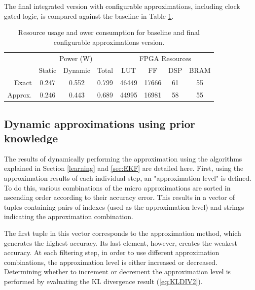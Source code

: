 \par The final integrated version with configurable approximations, including clock gated logic, is compared against the baseline in Table \ref{table:integrated}.

\begin{table}[h]
\begin{tabular}{r c c c c c c c}
\toprule
 & \multicolumn{3}{c}{Power (W)} & \multicolumn{4}{c}{FPGA Resources}\\
 & Static & Dynamic & Total & LUT & FF & DSP & BRAM\\
\hline
Exact & 0.247 & 0.552 & 0.799 & 46449 & 17666 & 61 & 55\\
Approx. & 0.246 & 0.443 & 0.689 & 44995 & 16981 & 58 & 55\\
\hline
\end{tabular}
\caption{Resource usage and ower consumption for baseline and final configurable approximations version.}
\label{table:integrated}
\end{table}





\subsection{Dynamic approximations using prior knowledge}
The results of dynamically performing the approximation using the algorithms explained in Section \ref{learning} and \ref{sec:EKF} are detailed here. First, using the approximation results of each individual step, an "approximation level" is defined. To do this, various combinations of the micro approximations are sorted in ascending order according to their accuracy error. This results in a vector of tuples containing pairs of indexes (used as the approximation level) and strings indicating the approximation combination. 

The first tuple in this vector corresponds to the approximation method, which generates the highest accuracy. Its last element, however, creates the weakest accuracy.
At each filtering step, in order to use different approximation combinations, the approximation level is either increased or decreased. Determining whether to increment or decrement the approximation level is performed by evaluating the KL divergence result (\ref{eq:KLDIV2}).

